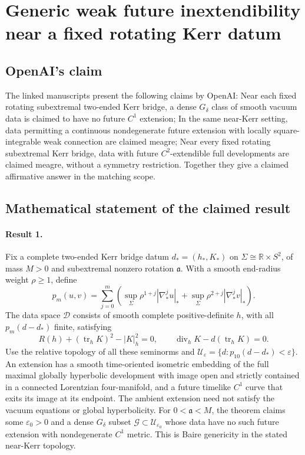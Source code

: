 \documentclass[11pt]{article}
\begin{document}
\section*{Generic weak future inextendibility near a fixed rotating Kerr datum}

\subsection{OpenAI's claim}
The linked manuscripts present the following claims by OpenAI: Near each fixed rotating subextremal two-ended Kerr bridge, a dense $G_\delta$ class of smooth vacuum data is claimed to have no future $C^1$ extension; In the same near-Kerr setting, data permitting a continuous nondegenerate future extension with locally square-integrable weak connection are claimed meagre; Near every fixed rotating subextremal Kerr bridge, data with future $C^2$-extendible full developments are claimed meagre, without a symmetry restriction. Together they give a claimed affirmative answer in the matching scope.

\subsection{Mathematical statement of the claimed result}
\paragraph{Result 1.} Fix a complete two-ended Kerr bridge datum \(d_*=(h_*,K_*)\) on \(\Sigma\cong\mathbb R\times S^2\), of mass \(M>0\) and subextremal nonzero rotation \(\mathfrak a\). With a smooth end-radius weight \(\rho\ge1\), define
\[
 p_m(u,v)=\sum_{j=0}^m\left(\sup_\Sigma\rho^{1+j}|\nabla_*^ju|_*+
 \sup_\Sigma\rho^{2+j}|\nabla_*^jv|_*\right).
\]
The data space \(\mathcal D\) consists of smooth complete positive-definite \(h\), with all \(p_m(d-d_*)\) finite, satisfying
\[
 R(h)+(\operatorname{tr}_hK)^2-|K|_h^2=0,\qquad
 \operatorname{div}_hK-d(\operatorname{tr}_hK)=0.
\]
Use the relative topology of all these seminorms and \(\mathcal U_\varepsilon=\{d:p_{10}(d-d_*)<\varepsilon\}\). An extension has a smooth time-oriented isometric embedding of the full maximal globally hyperbolic development with image open and strictly contained in a connected Lorentzian four-manifold, and a future timelike \(C^1\) curve that exits its image at its endpoint. The ambient extension need not satisfy the vacuum equations or global hyperbolicity. For \(0<\mathfrak a<M\), the theorem claims some \(\varepsilon_0>0\) and a dense \(G_\delta\) subset \(\mathcal G\subset\mathcal U_{\varepsilon_0}\) whose data have no such future extension with nondegenerate \(C^1\) metric. This is Baire genericity in the stated near-Kerr topology.
\end{document}
